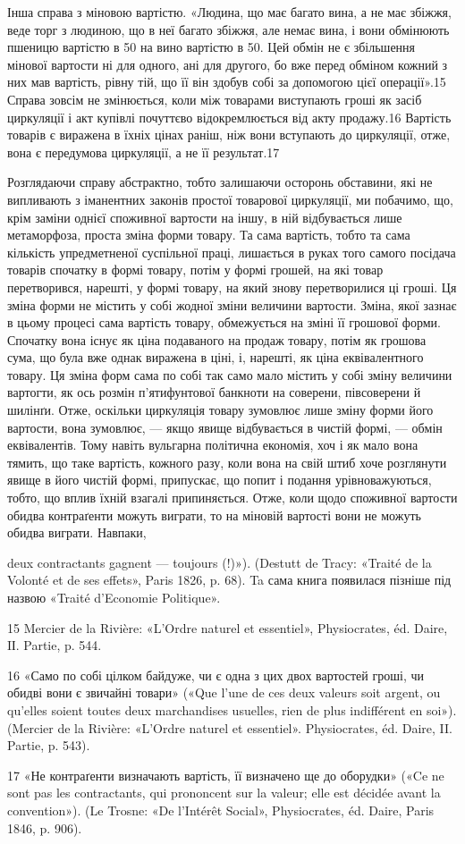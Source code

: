 Інша справа з міновою вартістю. «Людина, що має багато вина,
а не має збіжжя, веде торг з людиною, що в неї багато збіжжя,
але немає вина, і вони обмінюють пшеницю вартістю в 50 на
вино вартістю в 50. Цей обмін не є збільшення мінової вартости
ні для одного, ані для другого, бо вже перед обміном кожний
з них мав вартість, рівну тій, що її він здобув собі за допомогою
цієї операції».15 Справа зовсім не змінюється, коли між товарами
виступають гроші як засіб циркуляції і акт купівлі почуттєво
відокремлюється від акту продажу.16 Вартість товарів є виражена
в їхніх цінах раніш, ніж вони вступають до циркуляції, отже,
вона є передумова циркуляції, а не її результат.17

Розглядаючи справу абстрактно, тобто залишаючи осторонь
обставини, які не випливають з іманентних законів простої товарової
циркуляції, ми побачимо, що, крім заміни однієї споживної
вартости на іншу, в ній відбувається лише метаморфоза, проста
зміна форми товару. Та сама вартість, тобто та сама кількість
упредметненої суспільної праці, лишається в руках того самого
посідача товарів спочатку в формі товару, потім у формі грошей,
на які товар перетворився, нарешті, у формі товару, на який
знову перетворилися ці гроші. Ця зміна форми не містить у собі
жодної зміни величини вартости. Зміна, якої зазнає в цьому процесі
сама вартість товару, обмежується на зміні її грошової
форми. Спочатку вона існує як ціна подаваного на продаж товару,
потім як грошова сума, що була вже однак виражена в ціні, і,
нарешті, як ціна еквівалентного товару. Ця зміна форм сама по
собі так само мало містить у собі зміну величини вартогти, як
ось розмін п’ятифунтової банкноти на соверени, півсоверени й
шилінґи. Отже, оскільки циркуляція товару зумовлює лише
зміну форми його вартости, вона зумовлює, — якщо явище відбувається
в чистій формі, — обмін еквівалентів. Тому навіть вульгарна
політична економія, хоч і як мало вона тямить, що таке
вартість, кожного разу, коли вона на свій штиб хоче розглянути
явище в його чистій формі, припускає, що попит і подання урівноважуються,
тобто, що вплив їхній взагалі припиняється. Отже,
коли щодо споживної вартости обидва контраґенти можуть виграти,
то на міновій вартості вони не можуть обидва виграти. Навпаки,

deux contractants gagnent — toujours (!)»). (Destutt de Tracy: «Traité de
la Volonté et de ses effets», Paris 1826, p. 68). Ta сама книга появилася пізніше
під назвою «Traité d’Economie Politique».

15 Mercier de la Rivière: «L’Ordre naturel et essentiel», Physiocrates, éd.
Daire, IІ. Partie, p. 544.

16 «Само по собі цілком байдуже, чи є одна з цих двох вартостей
гроші, чи обидві вони є звичайні товари» («Que l’une de ces deux valeurs
soit argent, ou qu’elles soient toutes deux marchandises usuelles, rien de
plus indifférent en soi»). (Mercier de la Rivière: «L’Ordre naturel et essentiel».
Physiocrates, éd. Daire, II. Partie, p. 543).

17 «Не контраґенти визначають вартість, її визначено ще до оборудки»
(«Ce ne sont pas les contractants, qui prononcent sur la valeur; elle est
décidée avant la convention»). (Le Trosne: «De l’Intérêt Social», Physiocrates,
éd. Daire, Paris 1846, p. 906).
